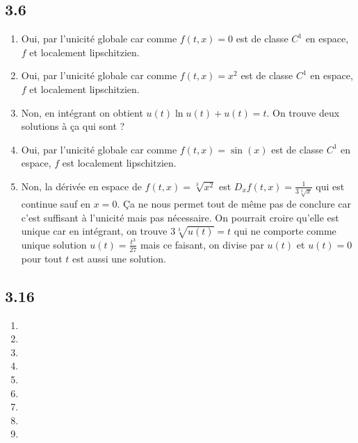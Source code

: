 \documentclass{article}
\begin{document}
\subsection*{3.6}
\begin{enumerate}
  \item Oui, par l'unicité globale car comme
    $f(t,x) = 0$ est de classe $C^1$ en espace,
    $f$ et localement lipschitzien.
  \item Oui, par l'unicité globale car comme
    $f(t,x) = x^2$ est de classe $C^1$ en espace,
    $f$ et localement lipschitzien.
  \item Non, en intégrant on obtient $u(t)\ln u(t) + u(t) = t$.
    On trouve deux solutions à ça qui sont ?
  \item Oui, par l'unicité globale car comme
    $f(t,x) = \sin(x)$ est de classe $C^1$ en espace,
    $f$ est localement lipschitzien.
  \item Non, la dérivée en espace de $f(t,x) = \sqrt[3]{x^2}$ est
    $D_x f(t,x) = \frac{1}{3\sqrt[3]{x}}$ qui est continue sauf en $x = 0$.
    Ça ne nous permet tout de même pas de conclure car c'est suffisant à
    l'unicité mais pas nécessaire.
    On pourrait croire qu'elle est unique car en intégrant, on trouve
    $3\sqrt[3]{u(t)} = t$ qui ne comporte comme unique solution
    $u(t) = \frac{t^3}{27}$ mais ce faisant, on divise par $u(t)$ et
    $u(t) = 0$ pour tout $t$ est aussi une solution.
\end{enumerate}

\subsection*{3.16}
\begin{enumerate}
  \item
  \item
  \item
  \item
  \item
  \item
  \item
  \item
  \item
\end{enumerate}
\end{document}

